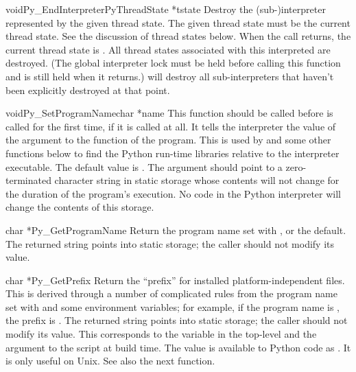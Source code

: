 \begin{cfuncdesc}{void}{Py_EndInterpreter}{PyThreadState *tstate}
Destroy the (sub-)interpreter represented by the given thread state.  
The given thread state must be the current thread state.  See the 
discussion of thread states below.  When the call returns, the current 
thread state is \NULL{}.  All thread states associated with this 
interpreted are destroyed.  (The global interpreter lock must be held 
before calling this function and is still held when it returns.)  
 will destroy all sub-interpreters that haven't 
been explicitly destroyed at that point.
\end{cfuncdesc}

\begin{cfuncdesc}{void}{Py_SetProgramName}{char *name}
This function should be called before  is called 
for the first time, if it is called at all.  It tells the interpreter 
the value of the  argument to the  function 
of the program.  This is used by  and some other 
functions below to find the Python run-time libraries relative to the 
interpreter executable.  The default value is .  The 
argument should point to a zero-terminated character string in static 
storage whose contents will not change for the duration of the 
program's execution.  No code in the Python interpreter will change 
the contents of this storage.
\end{cfuncdesc}

\begin{cfuncdesc}{char *}{Py_GetProgramName}{}
Return the program name set with , or the 
default.  The returned string points into static storage; the caller 
should not modify its value.
\end{cfuncdesc}

\begin{cfuncdesc}{char *}{Py_GetPrefix}{}
Return the ``prefix'' for installed platform-independent files.  This 
is derived through a number of complicated rules from the program name 
set with  and some environment variables; 
for example, if the program name is , 
the prefix is .  The returned string points into 
static storage; the caller should not modify its value.  This 
corresponds to the  variable in the top-level 
 and the  argument to the 
 script at build time.  The value is available to 
Python code as .  It is only useful on Unix.  See 
also the next function.
\end{cfuncdesc}

